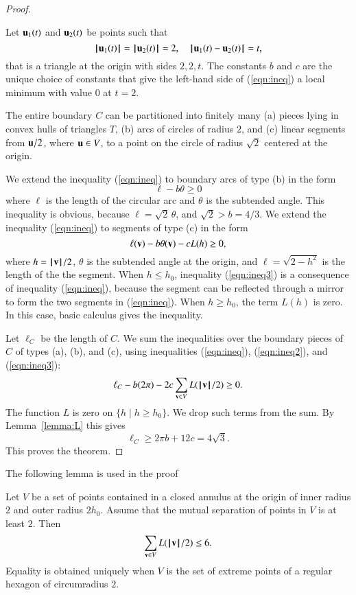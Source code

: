\documentclass{llncs}
\begin{document}
\begin{proof}
\begin{remark}
Let ${\mathbf u}_1(t)$ and ${\mathbf u}_2(t)$ be points such  that
\[
\normo{\u_1(t)}=\normo{\u_2(t)}=2,\quad \norm{\u_1(t)}{\u_2(t)}=t,
\]
that is a triangle at the origin with sides $2,2,t$.   The constants $b$ and $c$ are the unique choice
of constants that give the left-hand side of (\ref{eqn:ineq}) a local minimum with value
$0$ at $t=2$.
\end{remark}

The entire boundary $C$ can be partitioned into finitely many (a) pieces lying in convex hulls
of triangles $T$,  (b) arcs of circles of radius $2$, and (c)  linear segments
 from ${\mathbf u}/2$, where ${\mathbf u}\in V$, to a point on the circle of radius $\sqrt2$ centered at the origin.

We extend the inequality (\ref{eqn:ineq}) to boundary arcs of type (b) in the form
\begin{equation}\label{eqn:ineq2}
\ell - b \theta \ge 0
\end{equation}
where $\ell$ is the length of the circular arc and $\theta$ is the subtended angle.
This inequality is obvious, because $\ell = \sqrt2\,\theta$, and $\sqrt2>b = 4/3$.
We extend the inequality (\ref{eqn:ineq}) to segments of type (c) in the form
\begin{equation}\label{eqn:ineq3}
\ell({\mathbf v}) - b\theta({\mathbf v}) - c L(h) \ge 0,
\end{equation}
where $h ={{\hskip0.1em|\hskip-0.15em|\hskip0.1em}{\mathbf v}{\hskip0.1em|\hskip-0.15em|\hskip0.1em}}/2$, $\theta$ is the subtended angle at the origin, and $\ell = \sqrt{2-h^2}$
is the length of the the segment.  
When $h\le h_0$,  inequality (\ref{eqn:ineq3}) is a consequence of inequality (\ref{eqn:ineq}), because
the segment can be reflected through a mirror to form the two segments in (\ref{eqn:ineq}).
When $h\ge h_0$, the term $L(h)$ is zero.  In this case, basic calculus gives the inequality.

Let $\ell_C$ be the length of $C$.
We sum the inequalities over the boundary pieces of $C$ of types (a), (b), and (c),
using inequalities (\ref{eqn:ineq}), (\ref{eqn:ineq2}), and (\ref{eqn:ineq3}):
\[
\ell_C - b (2\pi) - 2 c \sum_{{\mathbf v}\in V} L({{\hskip0.1em|\hskip-0.15em|\hskip0.1em}{\mathbf v}{\hskip0.1em|\hskip-0.15em|\hskip0.1em}}/2) \ge 0.
\]
The function $L$ is zero on $\{h \mid h\ge h_0\}$.  We drop such terms from the sum.
By Lemma~\ref{lemma:L} this gives
\[
\ell_C \ge 2 \pi b + 12 c = 4\sqrt3.
\]
This proves the theorem.
\end{proof}

The following lemma is used in the proof

\begin{lemma}\label{lemma:L}
  Let $V$ be a set of points contained in a closed annulus at the
  origin of inner radius $2$ and outer radius $2h_0$.  Assume that
  the mutual separation of points in $V$ is at least $2$.  Then
\[
\sum_{{\mathbf v}\in V} L({{\hskip0.1em|\hskip-0.15em|\hskip0.1em}{\mathbf v}{\hskip0.1em|\hskip-0.15em|\hskip0.1em}}/2) \le 6.
\]
Equality is obtained uniquely when $V$ is the set of extreme points of a regular hexagon
of circumradius $2$.
\end{lemma}
\end{document}

